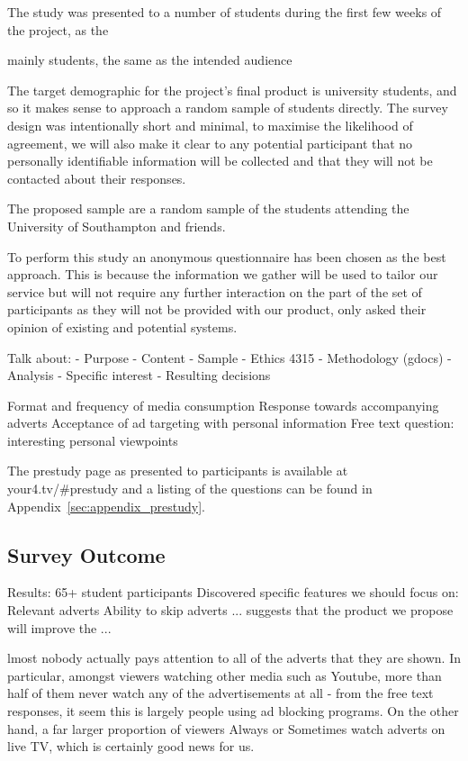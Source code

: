 The study was presented to a number of students during the first few weeks of the project, as the 

mainly students, the same as the intended audience


The target demographic for the project's final product is university students, and so it makes sense to approach a random sample of students directly. The survey design was intentionally short and minimal, to maximise the likelihood of agreement, we will also make it clear to any potential participant that no personally identifiable information will be collected and that they will not be contacted about their responses. %

The proposed sample are a random sample of the students attending the University of Southampton and friends.


To perform this study an anonymous questionnaire has been chosen as the best approach. This is because the information we gather will be used to tailor our service but will not require any further interaction on the part of the set of participants as they will not be provided with our product, only asked their opinion of existing and potential systems.



Talk about:
 - Purpose
 - Content
 - Sample
 - Ethics 4315
 - Methodology (gdocs)
 - Analysis
  - Specific interest
  - Resulting decisions


Format and frequency of media consumption
Response towards accompanying adverts
Acceptance of ad targeting with personal information
Free text question: interesting personal viewpoints





The prestudy page as presented to participants is available at your4.tv/#prestudy and a listing of the questions can be found in Appendix~\ref{sec:appendix_prestudy}. %


\subsection{Survey Outcome}

Results:
65+ student participants
Discovered specific features we should  focus on:
Relevant adverts
Ability to skip adverts
... suggests that the product we propose will improve the ...

lmost nobody actually pays attention to all of the adverts that they are shown. In particular, amongst viewers watching other media such as Youtube, more than half of them never watch any of the advertisements at all - from the free text responses, it seem this is largely people using ad blocking programs. On the other hand, a far larger proportion of viewers Always or Sometimes watch adverts on live TV, which is certainly good news for us.


